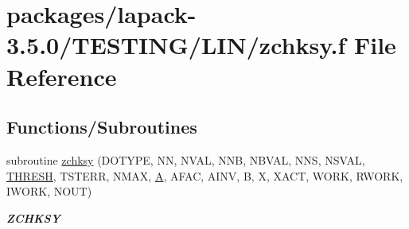 \hypertarget{zchksy_8f}{}\section{packages/lapack-\/3.5.0/\+T\+E\+S\+T\+I\+N\+G/\+L\+I\+N/zchksy.f File Reference}
\label{zchksy_8f}
\subsection*{Functions/\+Subroutines}
\begin{DoxyCompactItemize}
\item 
subroutine \hyperlink{group__complex16__lin_gabbc1a27f72fa2ad45d3bf6e697c0d9a8}{zchksy} (D\+O\+T\+Y\+P\+E, N\+N, N\+V\+A\+L, N\+N\+B, N\+B\+V\+A\+L, N\+N\+S, N\+S\+V\+A\+L, \hyperlink{zlaqgs_8c_a0656018abfc9fa2821827415f5d5ea57}{T\+H\+R\+E\+S\+H}, T\+S\+T\+E\+R\+R, N\+M\+A\+X, \hyperlink{classA}{A}, A\+F\+A\+C, A\+I\+N\+V, B, X, X\+A\+C\+T, W\+O\+R\+K, R\+W\+O\+R\+K, I\+W\+O\+R\+K, N\+O\+U\+T)
\begin{DoxyCompactList}\small\item\em {\bfseries Z\+C\+H\+K\+S\+Y} \end{DoxyCompactList}\end{DoxyCompactItemize}
